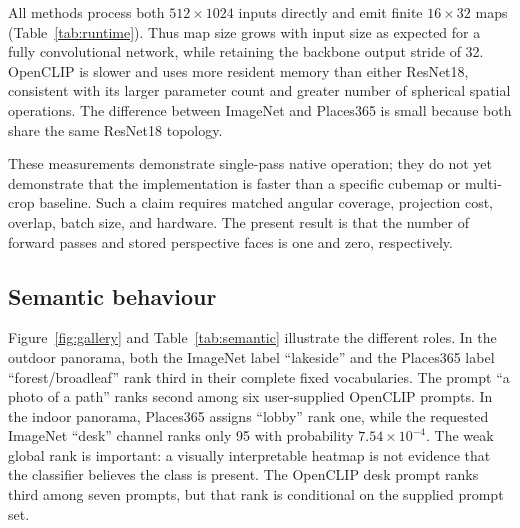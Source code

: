\documentclass{isprs}
\begin{document}
All methods process both $512\!\times\!1024$ inputs directly and emit finite
$16\!\times\!32$ maps (Table~\ref{tab:runtime}).  Thus map size grows with
input size as expected for a fully convolutional network, while retaining the
backbone output stride of 32.  OpenCLIP is slower and uses more resident memory
than either ResNet18, consistent with its larger parameter count and greater
number of spherical spatial operations.  The difference between ImageNet and
Places365 is small because both share the same ResNet18 topology.

\begin{table}[t]
\centering
\caption{One-thread CPU native spherical inference over two panoramas.  Peak
RSS is the maximum observed process resident set.}
\label{tab:runtime}
\end{table}

These measurements demonstrate single-pass native operation; they do not yet
demonstrate that the implementation is faster than a specific cubemap or
multi-crop baseline.  Such a claim requires matched angular coverage,
projection cost, overlap, batch size, and hardware.  The present result is that
the number of forward passes and stored perspective faces is one and zero,
respectively.

\subsection{Semantic behaviour}

Figure~\ref{fig:gallery} and Table~\ref{tab:semantic} illustrate the different
roles.  In the outdoor panorama, both the ImageNet label ``lakeside'' and the
Places365 label ``forest/broadleaf'' rank third in their complete fixed
vocabularies.  The prompt ``a photo of a path'' ranks second among six
user-supplied OpenCLIP prompts.  In the indoor panorama, Places365 assigns
``lobby'' rank one, while the requested ImageNet ``desk'' channel ranks only 95
with probability $7.54\times10^{-4}$.  The weak global rank is important: a
visually interpretable heatmap is not evidence that the classifier believes
the class is present.  The OpenCLIP desk prompt ranks third among seven prompts,
but that rank is conditional on the supplied prompt set.
\end{document}
